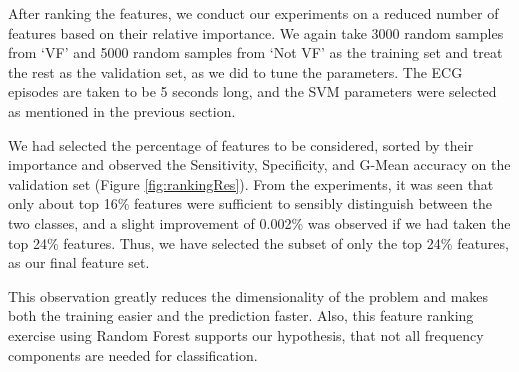 \documentclass[12pt,a4paper]{article}
\begin{document}

After ranking the features, we conduct our experiments on a reduced number of features based on their relative importance. We again take 3000 random samples from `VF' and 5000 random samples from `Not VF' as the training set and treat the rest as the validation set, as we did to tune the parameters. The ECG episodes are taken to be 5 seconds long, and the SVM parameters were selected as mentioned in the previous section.

We had selected the percentage of features to be considered, sorted by their importance and observed the Sensitivity, Specificity, and G-Mean accuracy on the validation set (Figure \ref{fig:rankingRes}). From the experiments, it was seen that only about top 16\% features were sufficient to sensibly distinguish between the two classes, and a slight improvement of 0.002\% was observed if we had taken the top 24\% features. Thus, we have selected the subset of only the top 24\% features, as our final feature set. 

This observation greatly reduces the dimensionality of the problem and makes both the training easier and the prediction faster. Also, this feature ranking exercise using Random Forest supports our hypothesis, that not all frequency components are needed for classification.
\end{document}
